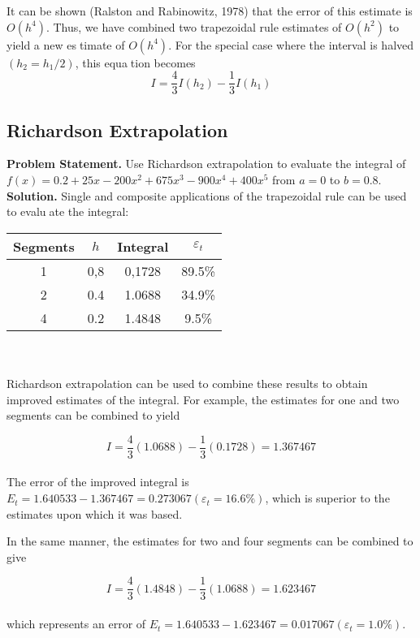 It can be shown (Ralston and Rabinowitz, 1978) that the error of this estimate is
$O(h^4)$. Thus, we have combined two trapezoidal rule estimates of $O(h^2)$ to yield a new estimate of $O(h^4)$. For the special case where the interval is halved $(h_2 = h_1/2)$, this equation becomes
\begin{equation}
	\tag{20.5}
	I=\dfrac{4}{3}I(h_2)-\dfrac{1}{3}I(h_1)
\end{equation}

\subsection{Richardson Extrapolation}
\textbf{Problem Statement.} Use Richardson extrapolation to evaluate the integral of $f(x) =
0.2 + 25x − 200x^2 + 675x^3 − 900x^4 + 400x^5$ from $a = 0$ to $b = 0.8.$\\
\vspace{0.1in}
\textbf{Solution.} Single and composite applications of the trapezoidal rule can be used to evaluate the integral:\\


\begin{tabular}{cccc}
	\hline
	\textbf{Segments} & \textbf{$h$} & \textbf{Integral} & \textbf{$\varepsilon_t$}\\ \hline
	1 & 0,8 & 0,1728 & 89.5\%\\
	2 & 0.4 & 1.0688 & 34.9\%\\
	4 & 0.2 & 1.4848 & 9.5\%\\ \hline
\end{tabular}\\

\vspace{0.5}\\
Richardson extrapolation can be used to combine these results to obtain improved estimates
of the integral. For example, the estimates for one and two segments can be combined to yield
	
	$$I=\dfrac{4}{3}(1.0688)-\dfrac{1}{3}(0.1728)=1.367467$$\\
The error of the improved integral is $E_t = 1.640533 − 1.367467 = 0.273067(\varepsilon_t = 16.6\%)$, 
which is superior to the estimates upon which it was based.

In the same manner, the estimates for two and four segments can be combined to give

	$$I=\dfrac{4}{3}(1.4848)-\dfrac{1}{3}(1.0688)=1.623467$$\\
which represents an error of $E_t = 1.640533 − 1.623467 = 0.017067 (\varepsilon_t = 1.0\%)$.

